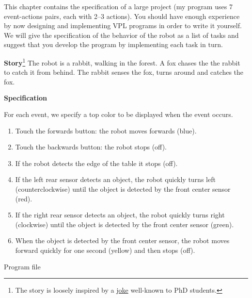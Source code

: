 \label{ch.rabbit}

This chapter contains the specification of a large project (my program
uses 7 event-actions pairs, each with 2--3 actions). You should have
enough experience by now designing and implementing VPL programs in
order to write it yourself. We will give the specification of the
behavior of the robot as a list of tasks and suggest that you develop
the program by implementing each task in turn.


\textbf{Story}\footnote{The story is loosely inspired by a
\href{http://www.cs.hmc.edu/~fleck/parable.html}{joke}
well-known to PhD students.} The robot is a rabbit,
walking in the forest. A fox chases the the rabbit to catch
it from behind. The rabbit senses the fox, turns around and catches the
fox.


\textbf{Specification}

For each event, we specify a top color to be displayed when the event occurs.

\begin{enumerate}
\item Touch the forwards button: the robot moves forwards (blue).
\item Touch the backwards button: the robot stops (off).
\item If the robot detects the edge of the table it stops (off).
\item If the left rear sensor detects an object, the robot quickly turns
left (counterclockwise) until the object is detected by the front center
sensor (red).
\item If the right rear sensor detects an object, the robot quickly turns
right (clockwise) until the object is detected by the front center
sensor (green).
\item When the object is detected by the front center sensor, the robot
moves forward quickly for one second (yellow) and then stops (off).
\end{enumerate}

{\raggedleft \hfill Program file }

